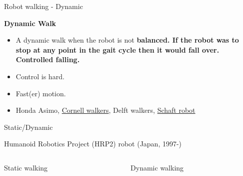 \documentclass[compress]{beamer}
\begin{document}
\begin{frame}{Robot walking - Dynamic}

    \textbf{Dynamic Walk}

    \begin{itemize}

        \item A dynamic walk when the robot is not \textbf{balanced. If the robot
            was to stop at any point in the gait cycle then it would fall over.
            Controlled falling.}
        \item Control is hard.
        \item Fast(er) motion.
        \item Honda Asimo, \href{http://www.youtube.com/watch?v=KLepY1AsaRk}{Cornell
            walkers}, Delft walkers,
            \href{http://www.youtube.com/watch?v=diaZFIUBMBQ}{Schaft robot}
    \end{itemize}

\end{frame}

\begin{frame}{Static/Dynamic}

    Humanoid Robotics Project (HRP2) robot (Japan, 1997-)

    \vspace{1em}
    \begin{columns}
        \begin{column}{0.5\linewidth}
    Static walking

            
        \end{column}
        \begin{column}{0.5\linewidth}
    Dynamic walking

        \end{column}
    \end{columns}



\end{frame}
\end{document}
